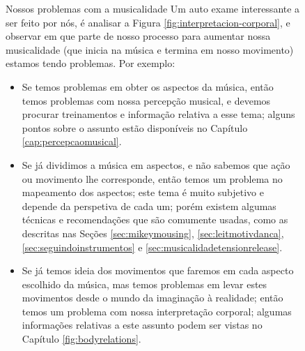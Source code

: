 \begin{figure}[!h]
\begin{elaboracion}{Nossos problemas com a musicalidade}
Um auto exame interessante a ser feito por nós, é analisar a Figura \ref{fig:interpretacion-corporal},
e observar em que parte de  nosso processo para aumentar nossa musicalidade  
(que inicia na música e termina em nosso movimento) estamos tendo problemas. Por exemplo:
\begin{itemize}
\item Se temos problemas em obter os aspectos da música, 
então temos problemas com nossa percepção musical,
e devemos procurar treinamentos e informação relativa a esse tema;
alguns pontos sobre o assunto estão disponíveis no Capítulo \ref{cap:percepcaomusical}.
\item Se já dividimos a música em aspectos, e não sabemos que ação ou movimento lhe corresponde,
então temos um problema no mapeamento dos aspectos;
este tema é muito subjetivo e depende da perspetiva de cada um;
porém existem algumas técnicas e recomendações que são comumente usadas,
como as descritas nas Seções \ref{sec:mikeymousing}, \ref{sec:leitmotivdanca}, 
\ref{sec:seguindoinstrumentos} e \ref{sec:musicalidadetensionrelease}.
\item Se já temos  ideia dos movimentos que faremos em cada aspecto escolhido da música,
mas temos problemas em levar estes movimentos desde o mundo da imaginação à realidade;
então temos um problema com nossa interpretação corporal;
algumas informações relativas a este assunto podem ser vistas no Capítulo  \ref{fig:bodyrelations}.
\end{itemize}
\end{elaboracion}
\label{fig:testemusicalidade}
\end{figure}


